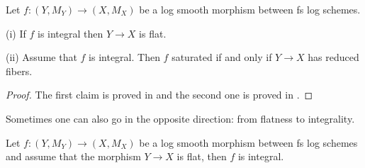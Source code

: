 \documentclass[10pt]{../fichiers-configuration-latex/smfart}
\begin{document}
\begin{proposition2}\label{10-saturprop1}
Let $f{\colon}(Y,M_Y)\to(X,M_X)$ be a log smooth morphism between fs log schemes.

(i) If $f$ is integral then $Y\to X$ is flat.

(ii) Assume that $f$ is integral. Then $f$ saturated if and only if $Y\to X$ has reduced fibers.
\end{proposition2}
\begin{proof}
The first claim is proved in \cite[4.5]{LSFI@Kato} and the second one is proved in \cite[II 4.2]{Saturated@Tsuji}.
\end{proof}

Sometimes one can also go in the opposite direction: from flatness to integrality.

\begin{proposition2}\label{10-saturprop2}
Let $f{\colon}(Y,M_Y)\to(X,M_X)$ be a log smooth morphism between fs log schemes and
 assume that the morphism $Y\to X$ is flat, then $f$ is integral.
\end{proposition2}
\end{document}
